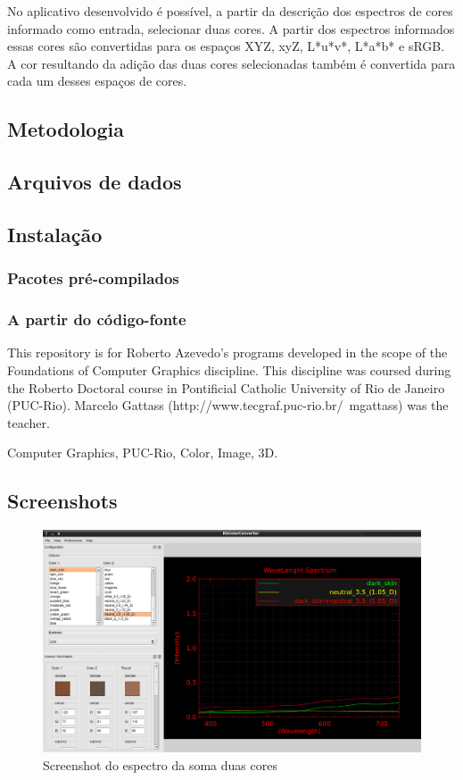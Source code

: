 \documentclass[a4paper,10pt]{report}
\begin{document}
\par
No aplicativo desenvolvido é possível, a partir da descrição dos espectros de
cores informado como entrada, selecionar duas cores. A partir dos espectros
informados essas cores são convertidas para os espaços XYZ, xyZ, L*u*v*,
L*a*b* e sRGB. A cor resultando da adição das duas cores selecionadas também é
convertida para cada um desses espaços de cores.

\subsection{Metodologia}

\subsection{Arquivos de dados}

\subsection{Instalação}
\subsubsection{Pacotes pré-compilados}

\subsubsection{A partir do código-fonte}
This repository is for Roberto Azevedo's programs developed in the scope of the
Foundations of Computer Graphics discipline. This discipline was coursed during
the Roberto Doctoral course in Pontificial Catholic University of Rio de Janeiro
(PUC-Rio). Marcelo Gattass (http://www.tecgraf.puc-rio.br/~mgattass) was the
teacher.

Computer Graphics, PUC-Rio, Color, Image, 3D.

\subsection{Screenshots}

\begin{figure}[!htb]
     \centering
     \includegraphics[scale=0.7]{img/screenshot_RGColorConverter.png}
     \caption{Screenshot do espectro da soma duas cores}
     \label{fig:screenshot_01}
\end{figure}
\end{document}
